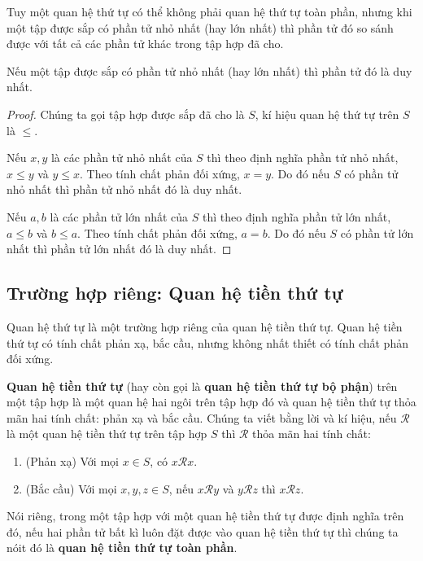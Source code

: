 Tuy một quan hệ thứ tự có thể không phải quan hệ thứ tự toàn phần, nhưng khi một tập được sắp có phần tử nhỏ nhất (hay lớn nhất) thì phần tử đó so sánh được với tất cả các phần tử khác trong tập hợp đã cho.

\begin{theorem}
    Nếu một tập được sắp có phần tử nhỏ nhất (hay lớn nhất) thì phần tử đó là duy nhất.
\end{theorem}

\begin{proof}
    Chúng ta gọi tập hợp được sắp đã cho là $S$, kí hiệu quan hệ thứ tự trên $S$ là $\leq$.

    Nếu $x, y$ là các phần tử nhỏ nhất của $S$ thì theo định nghĩa phần tử nhỏ nhất, $x\leq y$ và $y\leq x$. Theo tính chất phản đối xứng, $x = y$. Do đó nếu $S$ có phần tử nhỏ nhất thì phần tử nhỏ nhất đó là duy nhất.

    Nếu $a, b$ là các phần tử lớn nhất của $S$ thì theo định nghĩa phần tử lớn nhất, $a\leq b$ và $b\leq a$. Theo tính chất phản đối xứng, $a = b$. Do đó nếu $S$ có phần tử lớn nhất thì phần tử lớn nhất đó là duy nhất.
\end{proof}

\subsection{Trường hợp riêng: Quan hệ tiền thứ tự}

Quan hệ thứ tự là một trường hợp riêng của quan hệ tiền thứ tự. Quan hệ tiền thứ tự có tính chất phản xạ, bắc cầu, nhưng không nhất thiết có tính chất phản đối xứng.

\begin{definition}
    \textbf{Quan hệ tiền thứ tự} (hay còn gọi là \textbf{quan hệ tiền thứ tự bộ phận}) trên một tập hợp là một quan hệ hai ngôi trên tập hợp đó và quan hệ tiền thứ tự thỏa mãn hai tính chất: phản xạ và bắc cầu. Chúng ta viết bằng lời và kí hiệu, nếu $\mathscr{R}$ là một quan hệ tiền thứ tự trên tập hợp $S$ thì $\mathscr{R}$ thỏa mãn hai tính chất:
    \begin{enumerate}[label={(\roman*)}]
        \item (Phản xạ) Với mọi $x\in S$, có $x\mathscr{R}x$.
        \item (Bắc cầu) Với mọi $x, y, z\in S$, nếu $x\mathscr{R}y$ và $y\mathscr{R}z$ thì $x\mathscr{R}z$.
    \end{enumerate}

    \noindent Nói riêng, trong một tập hợp với một quan hệ tiền thứ tự được định nghĩa trên đó, nếu hai phần tử bất kì luôn đặt được vào quan hệ tiền thứ tự thì chúng ta nóit đó là \textbf{quan hệ tiền thứ tự toàn phần}.
\end{definition}

